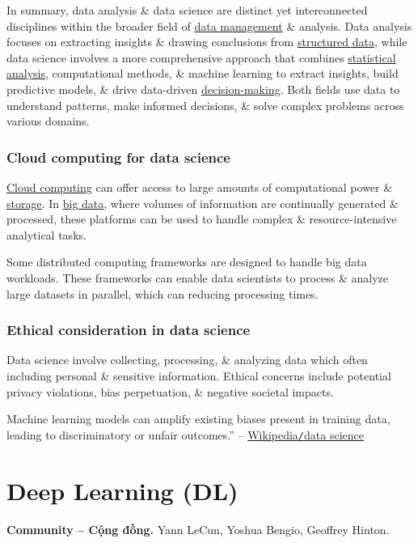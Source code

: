 \documentclass{article}
\begin{document}
In summary, data analysis \& data science are distinct yet interconnected disciplines within the broader field of \href{https://en.wikipedia.org/wiki/Data_management}{data management} \& analysis. Data analysis focuses on extracting insights \& drawing conclusions from \href{https://en.wikipedia.org/wiki/Structured_data}{structured data}, while data science involves a more comprehensive approach that combines \href{https://en.wikipedia.org/wiki/Statistical_analysis}{statistical analysis}, computational methods, \& machine learning to extract insights, build predictive models, \& drive data-driven \href{https://en.wikipedia.org/wiki/Decision-making}{decision-making}. Both fields use data to understand patterns, make informed decisions, \& solve complex problems across various domains.

\subsubsection{Cloud computing for data science}
\href{https://en.wikipedia.org/wiki/Cloud_computing}{Cloud computing} can offer access to large amounts of computational power \& \href{https://en.wikipedia.org/wiki/Data_storage}{storage}. In \href{https://en.wikipedia.org/wiki/Big_data}{big data}, where volumes of information are continually generated \& processed, these platforms can be used to handle complex \& resource-intensive analytical tasks.

Some distributed computing frameworks are designed to handle big data workloads. These frameworks can enable data scientists to process \& analyze large datasets in parallel, which can reducing processing times.

\subsubsection{Ethical consideration in data science}
Data science involve collecting, processing, \& analyzing data which often including personal \& sensitive information. Ethical concerns include potential privacy violations, bias perpetuation, \& negative societal impacts.

Machine learning models can amplify existing biases present in training data, leading to discriminatory or unfair outcomes.'' -- \href{https://en.wikipedia.org/wiki/Data_science}{Wikipedia{\tt/}data science}


\section{Deep Learning (DL)}
\textbf{\textsf{Community -- Cộng đồng.}} {\sc Yann LeCun, Yoshua Bengio, Geoffrey Hinton}.
\end{document}
